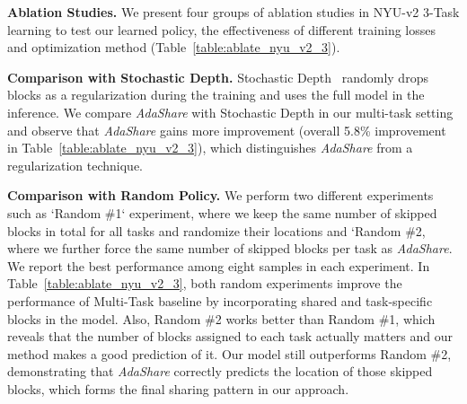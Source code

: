 \noindent\textbf{Ablation Studies.}
We present four groups of ablation studies in NYU-v2 3-Task learning to test our learned policy, the effectiveness of different training losses and optimization method (Table~\ref{table:ablate_nyu_v2_3}). 

\textbf{Comparison with Stochastic Depth.} Stochastic Depth~\cite{huang2016deep} randomly drops blocks as a regularization during the training and uses the full model in the inference. 
We compare \textit{AdaShare} with Stochastic Depth in our multi-task setting and observe that \textit{AdaShare} gains more improvement (overall 5.8\% improvement in Table~\ref{table:ablate_nyu_v2_3}), which distinguishes \textit{AdaShare} from a regularization technique.

\textbf{Comparison with Random Policy.}\label{sec:ablation_random}
We perform two different experiments such as `Random \#1` experiment, where we keep the same number of skipped blocks in total for all tasks and randomize their locations and `Random \#2, where we further force the same number of skipped blocks per task as \textit{AdaShare}.
We report the best performance among eight samples in each experiment. 
In Table~\ref{table:ablate_nyu_v2_3}, both random experiments improve the performance of Multi-Task baseline by incorporating shared and task-specific blocks in the model. Also, Random \#2 works better than Random \#1, which reveals that the number of blocks assigned to each task actually matters and our method makes a good prediction of it. Our model still outperforms Random \#2, demonstrating that \textit{AdaShare} correctly predicts the location of those skipped blocks, which forms the final sharing pattern in our approach.

